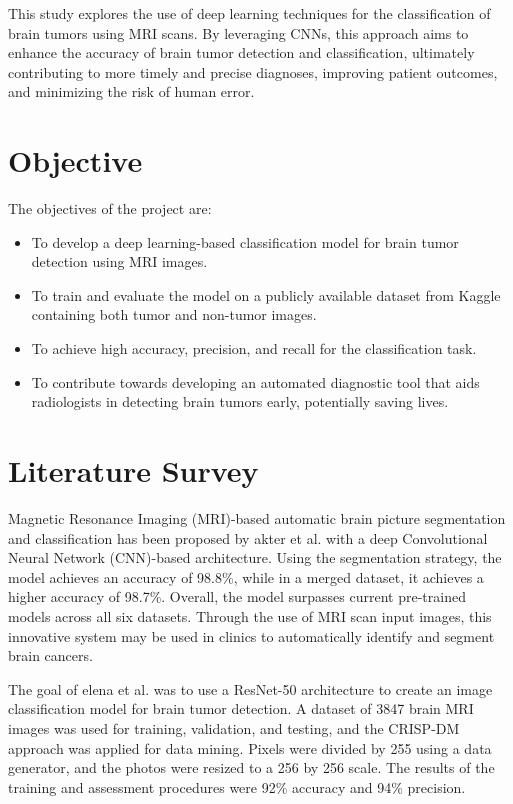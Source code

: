 \documentclass[twocolumn]{article}
\begin{document}
This study explores the use of deep learning techniques for the classification of brain tumors using MRI scans. By leveraging CNNs, this approach aims to enhance the accuracy of brain tumor detection and classification, ultimately contributing to more timely and precise diagnoses, improving patient outcomes, and minimizing the risk of human error.



\section{Objective}

The objectives of the project are:
\begin{itemize}
    \item To develop a deep learning-based classification model for brain tumor detection using MRI images.
    \item To train and evaluate the model on a publicly available dataset from Kaggle containing both tumor and non-tumor images.
    \item To achieve high accuracy, precision, and recall for the classification task.
    \item To contribute towards developing an automated diagnostic tool that aids radiologists in detecting brain tumors early, potentially saving lives.
\end{itemize}

\section{Literature Survey}
    Magnetic Resonance Imaging (MRI)-based automatic brain picture segmentation and classification has been proposed by akter et al. \cite{akter2024robust} with a deep Convolutional Neural Network (CNN)-based architecture. Using the segmentation strategy, the model achieves an accuracy of 98.8\%, while in a merged dataset, it achieves a higher accuracy of 98.7\%. Overall, the model surpasses current pre-trained models across all six datasets. Through the use of MRI scan input images, this innovative system may be used in clinics to automatically identify and segment brain cancers.
    
     The goal of elena et al. \cite{elena2023brain} was to use a ResNet-50 architecture to create an image classification model for brain tumor detection. A dataset of 3847 brain MRI images was used for training, validation, and testing, and the CRISP-DM approach was applied for data mining. Pixels were divided by 255 using a data generator, and the photos were resized to a 256 by 256 scale. The results of the training and assessment procedures were 92\% accuracy and 94\% precision.
    
\end{document}
